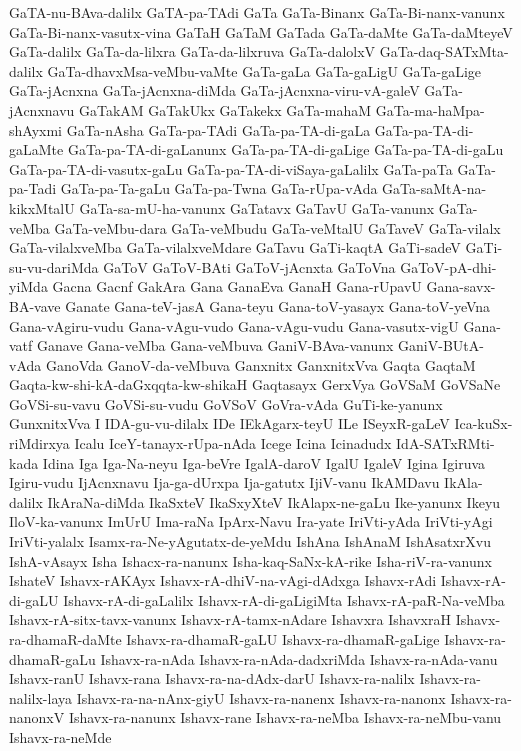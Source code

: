 {GaTA-nu-BAva-dalilx
GaTA-pa-TAdi
GaTa
GaTa-Binanx
GaTa-Bi-nanx-vanunx
GaTa-Bi-nanx-vasutx-vina
GaTaH
GaTaM
GaTada
GaTa-daMte
GaTa-daMteyeV
GaTa-dalilx
GaTa-da-lilxra
GaTa-da-lilxruva
GaTa-dalolxV
GaTa-daq-SATxMta-dalilx
GaTa-dhavxMsa-veMbu-vaMte
GaTa-gaLa
GaTa-gaLigU
GaTa-gaLige
GaTa-jAcnxna
GaTa-jAcnxna-diMda
GaTa-jAcnxna-viru-vA-galeV
GaTa-jAcnxnavu
GaTakAM
GaTakUkx
GaTakekx
GaTa-mahaM
GaTa-ma-haMpa-shAyxmi
GaTa-nAsha
GaTa-pa-TAdi
GaTa-pa-TA-di-gaLa
GaTa-pa-TA-di-gaLaMte
GaTa-pa-TA-di-gaLanunx
GaTa-pa-TA-di-gaLige
GaTa-pa-TA-di-gaLu
GaTa-pa-TA-di-vasutx-gaLu
GaTa-pa-TA-di-viSaya-gaLalilx
GaTa-paTa
GaTa-pa-Tadi
GaTa-pa-Ta-gaLu
GaTa-pa-Twna
GaTa-rUpa-vAda
GaTa-saMtA-na-kikxMtalU
GaTa-sa-mU-ha-vanunx
GaTatavx
GaTavU
GaTa-vanunx
GaTa-veMba
GaTa-veMbu-dara
GaTa-veMbudu
GaTa-veMtalU
GaTaveV
GaTa-vilalx
GaTa-vilalxveMba
GaTa-vilalxveMdare
GaTavu
GaTi-kaqtA
GaTi-sadeV
GaTi-su-vu-dariMda
GaToV
GaToV-BAti
GaToV-jAcnxta
GaToVna
GaToV-pA-dhi-yiMda
Gacna
Gacnf
GakAra
Gana
GanaEva
GanaH
Gana-rUpavU
Gana-savx-BA-vave
Ganate
Gana-teV-jasA
Gana-teyu
Gana-toV-yasayx
Gana-toV-yeVna
Gana-vAgiru-vudu
Gana-vAgu-vudo
Gana-vAgu-vudu
Gana-vasutx-vigU
Gana-vatf
Ganave
Gana-veMba
Gana-veMbuva
GaniV-BAva-vanunx
GaniV-BUtA-vAda
GanoVda
GanoV-da-veMbuva
Ganxnitx
GanxnitxVva
Gaqta
GaqtaM
Gaqta-kw-shi-kA-daGxqqta-kw-shikaH
Gaqtasayx
GerxVya
GoVSaM
GoVSaNe
GoVSi-su-vavu
GoVSi-su-vudu
GoVSoV
GoVra-vAda
GuTi-ke-yanunx
GunxnitxVva
I
IDA-gu-vu-dilalx
IDe
IEkAgarx-teyU
ILe
ISeyxR-gaLeV
Ica-kuSx-riMdirxya
Icalu
IceY-tanayx-rUpa-nAda
Icege
Icina
Icinadudx
IdA-SATxRMti-kada
Idina
Iga
Iga-Na-neyu
Iga-beVre
IgalA-daroV
IgalU
IgaleV
Igina
Igiruva
Igiru-vudu
IjAcnxnavu
Ija-ga-dUrxpa
Ija-gatutx
IjiV-vanu
IkAMDavu
IkAla-dalilx
IkAraNa-diMda
IkaSxteV
IkaSxyXteV
IkAlapx-ne-gaLu
Ike-yanunx
Ikeyu
IloV-ka-vanunx
ImUrU
Ima-raNa
IpArx-Navu
Ira-yate
IriVti-yAda
IriVti-yAgi
IriVti-yalalx
Isamx-ra-Ne-yAgutatx-de-yeMdu
IshAna
IshAnaM
IshAsatxrXvu
IshA-vAsayx
Isha
Ishacx-ra-nanunx
Isha-kaq-SaNx-kA-rike
Isha-riV-ra-vanunx
IshateV
Ishavx-rAKAyx
Ishavx-rA-dhiV-na-vAgi-dAdxga
Ishavx-rAdi
Ishavx-rA-di-gaLU
Ishavx-rA-di-gaLalilx
Ishavx-rA-di-gaLigiMta
Ishavx-rA-paR-Na-veMba
Ishavx-rA-sitx-tavx-vanunx
Ishavx-rA-tamx-nAdare
Ishavxra
IshavxraH
Ishavx-ra-dhamaR-daMte
Ishavx-ra-dhamaR-gaLU
Ishavx-ra-dhamaR-gaLige
Ishavx-ra-dhamaR-gaLu
Ishavx-ra-nAda
Ishavx-ra-nAda-dadxriMda
Ishavx-ra-nAda-vanu
Ishavx-ranU
Ishavx-rana
Ishavx-ra-na-dAdx-darU
Ishavx-ra-nalilx
Ishavx-ra-nalilx-laya
Ishavx-ra-na-nAnx-giyU
Ishavx-ra-nanenx
Ishavx-ra-nanonx
Ishavx-ra-nanonxV
Ishavx-ra-nanunx
Ishavx-rane
Ishavx-ra-neMba
Ishavx-ra-neMbu-vanu
Ishavx-ra-neMde
}
